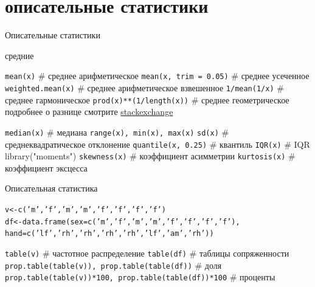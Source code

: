 \section{описательные статистики}
\begin{frame}{Описательные статистики}
\begin{itemize}
\mytem средние 
\begin{itemize}
\mytem \scriptsize \verb"mean(x)" \normalsize \hfill \# среднее арифметическое
\mytem \scriptsize \verb"mean(x, trim = 0.05)" \normalsize \hfill \# среднее усеченное
\mytem \scriptsize \verb"weighted.mean(x)" \normalsize \hfill \# среднее арифметическое взвешенное 
\mytem \scriptsize \verb"1/mean(1/x)" \normalsize \hfill \# среднее гармоническое
\mytem \scriptsize \verb"prod(x)**(1/length(x))" \normalsize \hfill \# среднее геометрическое
\mytem подробнее о разнице смотрите \href{http://stats.stackexchange.com/a/23130}{\alert{stackexchange}}
\end{itemize} 
\mytem \scriptsize \verb"median(x)" \normalsize \hfill \# медиана \bigskip
\mytem \scriptsize \verb"range(x), min(x), max(x)" \normalsize 
\mytem \scriptsize \verb"sd(x)" \normalsize \hfill \# среднеквадратическое отклонение
\mytem \scriptsize \verb"quantile(x, 0.25)" \normalsize \hfill \# квантиль
\mytem \scriptsize \verb"IQR(x)" \normalsize \hfill \# IQR \bigskip\\ 
\alert{library("moments")}
\mytem \scriptsize \verb"skewness(x)" \normalsize \hfill \# коэффициент асимметрии
\mytem \scriptsize \verb"kurtosis(x)" \normalsize \hfill \# коэффициент эксцесса
\end{itemize}
\end{frame}
\begin{frame}{Описательная статистика}
\scriptsize 
\begin{alltt}
v <- c('m', 'f', 'm', 'm', 'f', 'f', 'f', 'f')\\
df <- data.frame(sex = c('m', 'f', 'm', 'm', 'f', 'f', 'f', 'f'),\\
              hand = c('lf', 'rh', 'rh', 'rh', 'rh', 'lf', 'am', 'rh'))
\end{alltt}
\normalsize
\begin{itemize}
\mytem \scriptsize \verb"table(v)" \normalsize \hfill\#  частотное распределение
\mytem \scriptsize \verb"table(df)" \normalsize \hfill \# таблицы сопряженности
\mytem \scriptsize \verb"prop.table(table(v)), prop.table(table(df))" \normalsize \hfill \# доля
\mytem \scriptsize \verb"prop.table(table(v))*100, prop.table(table(df))*100" \normalsize \hfill \# проценты
\end{itemize}
\end{frame}
